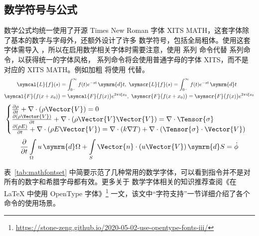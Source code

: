 \subsection{数学符号与公式}

数学公式均统一使用了开源 Times New Roman 字体 XITS MATH，这套字体除了基本的数字与字母外，还额外设计了许多
数学符号，包括全局粗体。使用这套字体需导入 ，所以在启用数学相关字体时需要注意，使用  系列
命令代替  系列命令，以获得统一的字体风格， 系列命令将会使用普通字母的字体 XITS，而不是
对应的 XITS MATH。例如加粗  将使用  代替。
\[
  \begin{split}
    \symcal{L} \{f\}(s) &= \int _{0^{-}}^{\infty} f(t) e^{-st} \, \symrm{d}t, \
    \symscr{L} \{f\}(s) = \int _{0^{-}}^{\infty} f(t) e^{-st} \, \symrm{d}t\\
    \symcal{F} \bigl( f(x+x_{0}) \bigr) &= \symcal{F} \bigl( f(x) \bigr) e^{2\pi i\xi x_{0}}, \
    \symscr{F} \bigl( f(x+x_{0}) \bigr) = \symscr{F} \bigl( f(x) \bigr) e^{2\pi i\xi x_{0}}
  \end{split}
\]
\begin{equation}\label{equ:1}
  \begin{cases}
    \frac{\partial \rho}{\partial t} + \nabla\cdot(\rho\Vector{V}) = 0                                                \\
    \frac{\partial (\rho\Vector{V})}{\partial t} + \nabla\cdot(\rho\Vector{V}\Vector{V}) = \nabla\cdot\Tensor{\sigma} \\
    \frac{\partial (\rho E)}{\partial t} + \nabla\cdot(\rho E\Vector{V}) = \nabla\cdot(k\nabla T) + \nabla\cdot(\Tensor{\sigma}\cdot\Vector{V})
  \end{cases}
\end{equation}
\begin{equation}\label{equ:2}
  \frac{\partial }{\partial t}\int\limits_{\Omega} u \, \symrm{d}\Omega + \int\limits_{S} \Vector{n}\cdot(u\Vector{V}) \, \symrm{d}S = \dot{\phi}
\end{equation}

表~\ref{tab:mathfontset} 中简要示范了几种常用的数学字体，可以看到指令并不是对所有的数字和希腊字母都有效。更多关于
数学字体相关的知识推荐查阅《在 \LaTeX{} 中使用 OpenType 字体》\footnote{\url{https://stone-zeng.github.io/2020-05-02-use-opentype-fonts-iii/}\label{stonezeng}}
一文，该文中``字符支持''一节详细介绍了各个命令的使用场景。

